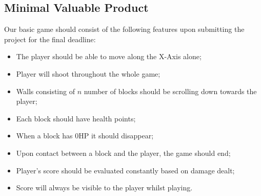 \documentclass[a4paper]{article}
\begin{document}
\subsection{Minimal Valuable Product}
 Our basic game should consist of the following features upon submitting the project for the final deadline:
 \begin{itemize}
   \item The player should be able to move along the X-Axis alone;
   \item Player will shoot throughout the whole game;
   \item Walls consisting of $n$ number of blocks should be scrolling down towards the player;
   \item Each block should have health points;
   \item When a block has 0HP it should disappear;
   \item Upon contact between a block and the player, the game should end;
   \item Player's score should be evaluated constantly based on damage dealt;
   \item Score will always be visible to the player whilst playing.
 \end{itemize}
 \newpage
\end{document}
